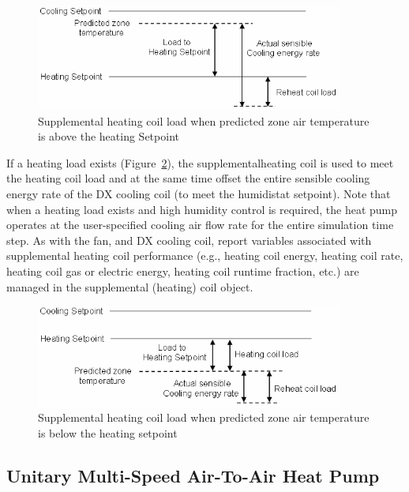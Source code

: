 \begin{figure}[hbtp] %
\centering
\includegraphics[width=0.9\textwidth, height=0.9\textheight, keepaspectratio=true]{media/image5145.png}
\caption{Supplemental heating coil load when predicted zone air temperature is above the heating Setpoint \protect \label{fig:supplemental-heating-coil-load-when-predicted-002}}
\end{figure}

If a heating load exists (Figure~\ref{fig:supplemental-heating-coil-load-when-predicted-003}), the supplementalheating coil is used to meet the heating coil load and at the same time offset the entire sensible cooling energy rate of the DX cooling coil (to meet the humidistat setpoint). Note that when a heating load exists and high humidity control is required, the heat pump operates at the user-specified cooling air flow rate for the entire simulation time step. As with the fan, and DX cooling coil, report variables associated with supplemental heating coil performance (e.g., heating coil energy, heating coil rate, heating coil gas or electric energy, heating coil runtime fraction, etc.) are managed in the supplemental (heating) coil object.

\begin{figure}[hbtp] %
\centering
\includegraphics[width=0.9\textwidth, height=0.9\textheight, keepaspectratio=true]{media/image5146.png}
\caption{Supplemental heating coil load when predicted zone air temperature is below the heating setpoint \protect \label{fig:supplemental-heating-coil-load-when-predicted-003}}
\end{figure}

\subsection{Unitary Multi-Speed Air-To-Air Heat Pump}\label{unitary-multi-speed-air-to-air-heat-pump}

